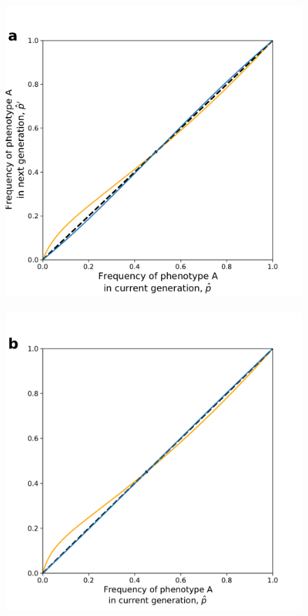 \documentclass[12pt]{extarticle}
\begin{document}
\begin{figure}[p]
  \centering
    \includegraphics[scale=0.45]{coexistence_without_oblique.pdf}~
    \includegraphics[scale=0.45]{coexistence_with_oblique.pdf}

\end{figure}
\end{document}
